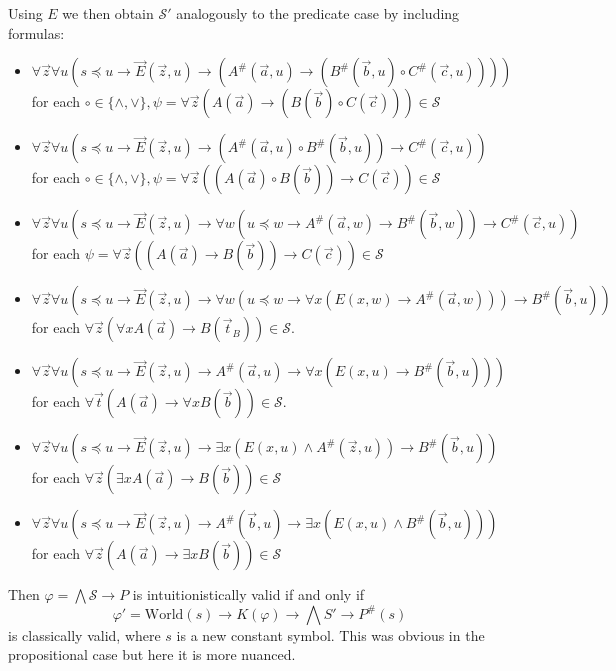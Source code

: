 \documentclass[a4paper,11pt]{report}
\theoremstyle{definition}
\theoremstyle{definition}
\theoremstyle{definition}
\theoremstyle{definition}
\theoremstyle{definition}
\theoremstyle{definition}
\theoremstyle{definition}
\begin{document}
	Using $E$ we then obtain $\mathcal S'$ analogously to the predicate case by including formulas:
	
	\begin{itemize}
		\item $\forall \vec z\forall u(s\preceq u\to \vec E(\vec z, u)\to (A^\#(\vec a, u)\to (B^\#(\vec b, u)\circ C^\#(\vec c, u))))$\\for each $\circ\in\{\wedge, \vee\}, \psi = \forall \vec z(A(\vec a)\to (B(\vec b)\circ C(\vec c)))\in\mathcal S$
		\item $\forall \vec z\forall u(s\preceq u\to\vec E(\vec z, u)\to (A^\#(\vec a, u)\circ B^\#(\vec b, u))\to C^\#(\vec c, u))$\\for each $\circ\in\{\wedge, \vee\}, \psi = \forall \vec z((A(\vec a)\circ B(\vec b))\to C(\vec c))\in\mathcal S$
		\item $\forall \vec z\forall u(s\preceq u\to\vec E(\vec z, u)\to\forall w(u\preceq w\to A^\#(\vec a, w)\to B^\#(\vec b, w))\to C^\#(\vec c, u))$\\ for each $\psi = \forall \vec z((A(\vec a)\to B(\vec b))\to C(\vec c))\in\mathcal S$
		\item  $\forall \vec z\forall u(s\preceq u\to\vec E(\vec z, u)\to \forall w(u\preceq w\to \forall x(E(x, w)\to A^\#(\vec a, w)))\to B^\#(\vec b, u))$\\for each $\forall \vec z(\forall xA(\vec a)\to B(\vec t_B))\in\mathcal S$.
		\item $\forall \vec z\forall u(s\preceq u\to\vec E(\vec z, u)\to A^\#(\vec a, u)\to \forall x(E(x, u)\to B^\#(\vec b, u)))$\\for each $\forall \vec t(A(\vec a)\to \forall xB(\vec b))\in\mathcal S$.
		\item $\forall \vec z\forall u(s\preceq u\to\vec E(\vec z, u)\to \exists x(E(x, u)\wedge A^\#(\vec z, u))\to B^\#(\vec b, u))$\\for each $\forall \vec z(\exists xA(\vec a)\to B(\vec b))\in\mathcal S$
		\item $\forall \vec z\forall u(s\preceq u\to\vec E(\vec z, u)\to A^\#(\vec b, u)\to \exists x(E(x, u)\wedge B^\#(\vec b, u)))$\\for each $\forall \vec z(A(\vec a)\to \exists xB(\vec b))\in\mathcal S$
	\end{itemize}
	
	Then $\varphi = \bigwedge\mathcal S\to P$ is intuitionistically valid if and only if
	$$\varphi' = \text{World}(s)\to K(\varphi)\to \bigwedge S'\to P^\#(s)$$
	is classically valid, where $s$ is a new constant symbol. This was obvious in the propositional case but here it is more nuanced.
	
\end{document}
